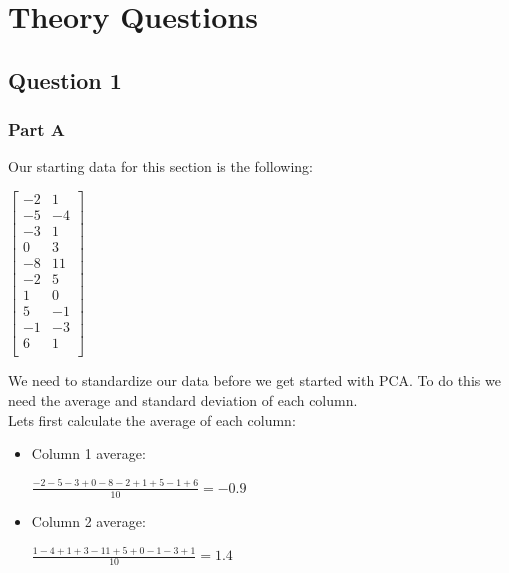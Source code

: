 \documentclass[12pt]{article}
\begin{document}
\maketitle

\newpage
\section{Theory Questions}
\subsection{Question 1}
\subsubsection{Part A}
\noindent

Our starting data for this section is the following:

\begin{center}
$\begin{bmatrix}
-2 & 1\\
-5 & -4\\
-3 & 1\\
0 & 3\\
-8 & 11\\
-2 & 5\\
1 & 0\\
5 & -1\\
-1 & -3\\
6 & 1\\
\end{bmatrix}$
\end{center}


\noindent
We need to standardize our data before we get started with PCA. To do this we need the average and standard deviation of each column.\\


\noindent
Lets first calculate the average of each column:\\
\begin{itemize}
\item
Column 1 average:\\

\begin{center}
$\frac{-2-5-3+0-8-2+1+5-1+6}{10} = -0.9$\\
\end{center}

\item
Column 2 average:\\

\begin{center}
$\frac{1-4+1+3-11+5+0-1-3+1}{10} = 1.4$\\
\end{center}

\end{itemize}
\end{document}
